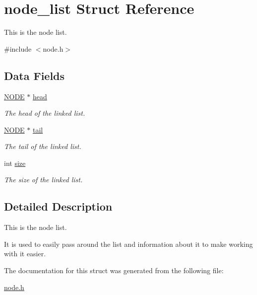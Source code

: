 \hypertarget{structnode__list}{\section{node\-\_\-list Struct Reference}
\label{structnode__list}
}


This is the node list.  




{\ttfamily \#include $<$node.\-h$>$}

\subsection*{Data Fields}
{\bf }\par
\begin{DoxyCompactItemize}
\item 
\hypertarget{structnode__list_a3fcff6f5048091e315ba66eefdcec95f}{\hyperlink{node_8h_a01aae0d1f45b520aec535df5f9d9afb7}{N\-O\-D\-E} $\ast$ \hyperlink{structnode__list_a3fcff6f5048091e315ba66eefdcec95f}{head}}\label{structnode__list_a3fcff6f5048091e315ba66eefdcec95f}

\begin{DoxyCompactList}\small\item\em The head of the linked list. \end{DoxyCompactList}\item 
\hypertarget{structnode__list_aa523fd648201b924692314d871e5de31}{\hyperlink{node_8h_a01aae0d1f45b520aec535df5f9d9afb7}{N\-O\-D\-E} $\ast$ \hyperlink{structnode__list_aa523fd648201b924692314d871e5de31}{tail}}\label{structnode__list_aa523fd648201b924692314d871e5de31}

\begin{DoxyCompactList}\small\item\em The tail of the linked list. \end{DoxyCompactList}\item 
\hypertarget{structnode__list_ab968974a927cc0c792fccada6cfc7922}{int \hyperlink{structnode__list_ab968974a927cc0c792fccada6cfc7922}{size}}\label{structnode__list_ab968974a927cc0c792fccada6cfc7922}

\begin{DoxyCompactList}\small\item\em The size of the linked list. \end{DoxyCompactList}\end{DoxyCompactItemize}



\subsection{Detailed Description}
This is the node list. 

It is used to easily pass around the list and information about it to make working with it easier. 

The documentation for this struct was generated from the following file\-:\begin{DoxyCompactItemize}
\item 
\hyperlink{node_8h}{node.\-h}\end{DoxyCompactItemize}
